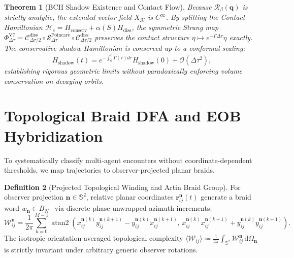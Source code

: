 \documentclass[11pt,a4paper,reqno]{article}
\theoremstyle{plain}
\newtheorem{theorem}{Theorem}[section]
\theoremstyle{definition}
\newtheorem{definition}[theorem]{Definition}
\theoremstyle{remark}
\numberwithin{equation}{section}
\begin{document}
\begin{theorem}[BCH Shadow Existence and Contact Flow]
Because $\mathcal{R}_\beta(\bm{q})$ is strictly analytic, the extended vector field $X_{\mathcal{K}}$ is $C^\infty$. By splitting the Contact Hamiltonian $\mathcal{H}_c = H_{\mathrm{conserv}} + \alpha(S) H_{\mathrm{diss}}$, the symmetric Strang map $\Phi_{\Delta \tau}^{\mathrm{V7}} = \mathcal{C}_{\Delta \tau/2}^{\mathrm{diss}} \circ \mathcal{S}_{\Delta \tau}^{\mathrm{Poincar\acute{e}}} \circ \mathcal{C}_{\Delta \tau/2}^{\mathrm{diss}}$ preserves the contact structure $\eta \mapsto e^{-\Gamma \Delta \tau} \eta$ exactly. The conservative shadow Hamiltonian is conserved up to a conformal scaling:
\begin{equation}
H_{\mathrm{shadow}}(t) = e^{-\int_0^t \Gamma(\tau) d\tau} H_{\mathrm{shadow}}(0) + \mathcal{O}(\Delta \tau^2),
\end{equation}
establishing rigorous geometric limits without paradoxically enforcing volume conservation on decaying orbits.
\end{theorem}

\bigskip

\section{Topological Braid DFA and EOB Hybridization}
\label{sec:automaton}

To systematically classify multi-agent encounters without coordinate-dependent thresholds, we map trajectories to observer-projected planar braids.

\begin{definition}[Projected Topological Winding and Artin Braid Group]
For observer projection $\mathbf{n} \in \mathbb{S}^2$, relative planar coordinates $\bm{r}_{ij}^{\mathbf{n}}(t)$ generate a braid word $w_{\mathbf{n}} \in B_N$~\cite{Artin1947,Birman1974} via discrete phase-unwrapped azimuth increments:
\begin{equation}
\mathcal{W}_{ij}^{\mathbf{n}} = \frac{1}{2\pi} \sum_{k=0}^{M-1} \operatorname{atan2}\left(x_{ij}^{\mathbf{n}(k)} y_{ij}^{\mathbf{n}(k+1)} - y_{ij}^{\mathbf{n}(k)} x_{ij}^{\mathbf{n}(k+1)}, \, x_{ij}^{\mathbf{n}(k)} x_{ij}^{\mathbf{n}(k+1)} + y_{ij}^{\mathbf{n}(k)} y_{ij}^{\mathbf{n}(k+1)}\right).
\end{equation}
The isotropic orientation-averaged topological complexity $\langle \mathcal{W}_{ij} \rangle \coloneqq \frac{1}{4\pi} \int_{\mathbb{S}^2} \mathcal{W}_{ij}^{\mathbf{n}} \, \mathrm{d}\Omega_{\mathbf{n}}$ is strictly invariant under arbitrary generic observer rotations.
\end{definition}
\end{document}
